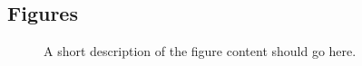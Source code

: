 \documentclass{bmcart}
\begin{document}
\begin{backmatter}





\section*{Figures}
  \begin{figure}[h!]
  \caption{
      A short description of the figure content
      should go here.}
      \end{figure}


\end{backmatter}
\end{document}
